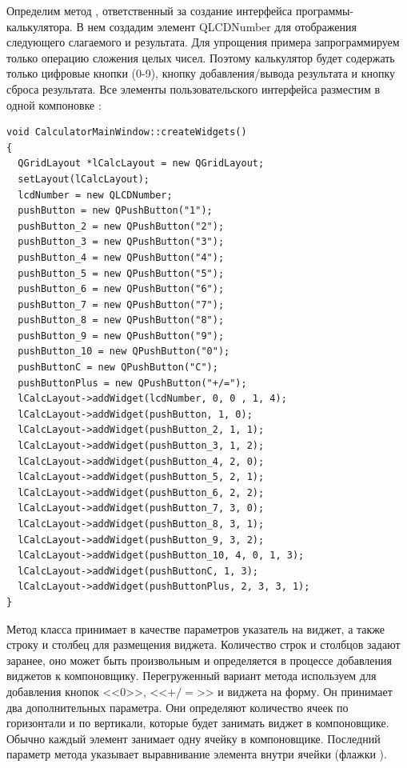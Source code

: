 Определим метод , ответственный за создание интерфейса программы-калькулятора. В
нем создадим элемент QLCDNumber для отображения следующего слагаемого и результата. Для упрощения примера
запрограммируем только операцию сложения целых чисел. Поэтому калькулятор будет содержать только цифровые кнопки (0-9),
кнопку добавления/вывода результата и кнопку сброса результата. Все элементы пользовательского интерфейса разместим в
одной компоновке :
\begin{lstlisting}
void CalculatorMainWindow::createWidgets()
{
  QGridLayout *lCalcLayout = new QGridLayout;
  setLayout(lCalcLayout);
  lcdNumber = new QLCDNumber;
  pushButton = new QPushButton("1");
  pushButton_2 = new QPushButton("2");
  pushButton_3 = new QPushButton("3");
  pushButton_4 = new QPushButton("4");
  pushButton_5 = new QPushButton("5");
  pushButton_6 = new QPushButton("6");
  pushButton_7 = new QPushButton("7");
  pushButton_8 = new QPushButton("8");
  pushButton_9 = new QPushButton("9");
  pushButton_10 = new QPushButton("0");
  pushButtonC = new QPushButton("C");
  pushButtonPlus = new QPushButton("+/=");
  lCalcLayout->addWidget(lcdNumber, 0, 0 , 1, 4);
  lCalcLayout->addWidget(pushButton, 1, 0);
  lCalcLayout->addWidget(pushButton_2, 1, 1);
  lCalcLayout->addWidget(pushButton_3, 1, 2);
  lCalcLayout->addWidget(pushButton_4, 2, 0);
  lCalcLayout->addWidget(pushButton_5, 2, 1);
  lCalcLayout->addWidget(pushButton_6, 2, 2);
  lCalcLayout->addWidget(pushButton_7, 3, 0);
  lCalcLayout->addWidget(pushButton_8, 3, 1);
  lCalcLayout->addWidget(pushButton_9, 3, 2);
  lCalcLayout->addWidget(pushButton_10, 4, 0, 1, 3);
  lCalcLayout->addWidget(pushButtonC, 1, 3);
  lCalcLayout->addWidget(pushButtonPlus, 2, 3, 3, 1);
}
\end{lstlisting}

Метод  класса  принимает в качестве параметров указатель на виджет, а также
строку и столбец для размещения виджета. Количество строк и столбцов задают заранее, оно может быть произвольным и
определяется в процессе добавления виджетов к компоновщику.
Перегруженный вариант метода  используем для добавления кнопок <<0>>, <<$+/=$>> и
виджета  на форму. Он принимает два дополнительных параметра. Они определяют количество ячеек по горизонтали
и по вертикали, которые будет занимать виджет в
компоновщике. Обычно каждый элемент занимает одну ячейку в
компоновщике. Последний параметр метода  указывает
выравнивание элемента внутри ячейки (флажки ).

